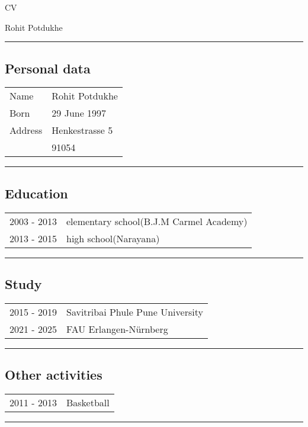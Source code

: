 \pagestyle{empty}


\begin{center}
{\sc \LARGE
CV
}

\medskip

\medskip

{\sc \Large
Rohit Potdukhe
}

\end{center}

\bigskip
\rule{\textwidth}{0.1em}




\subsection*{\sc Personal data}
\begin{tabular}{lp{9cm}}
Name & Rohit Potdukhe\\
Born &  29 June 1997\\
Address & Henkestrasse 5 \\
        & 91054
\end{tabular}
\smallskip

\rule{\textwidth}{0.1em}



\subsection*{\sc Education}
\begin{tabular}{lp{9cm}}
2003 - 2013 &  elementary school(B.J.M Carmel Academy)\\
2013 - 2015 & high school(Narayana)\\
\end{tabular}

\smallskip
\rule{\textwidth}{0.1em}

\subsection*{\sc Study}
\begin{tabular}{lp{9cm}}
2015 - 2019 & Savitribai Phule Pune University \\
2021 - 2025 & FAU Erlangen-Nürnberg
\end{tabular}


\smallskip
\rule{\textwidth}{0.1em}


\subsection*{\sc Other activities}
\begin{tabular}{lp{9cm}}
2011 - 2013 & Basketball
\end{tabular}


\smallskip
\rule{\textwidth}{0.1em}


